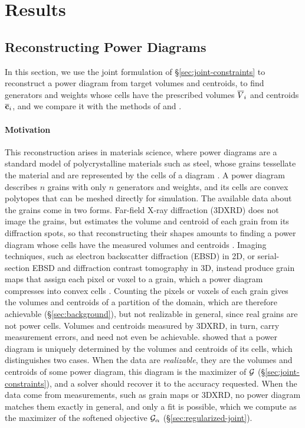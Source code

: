 \documentclass[main.tex]{subfiles}
\begin{document}
\section{Results}
\label{sec:results}

\subsection{Reconstructing Power Diagrams}
\label{sec:results-inverse}

In this section, we use the joint formulation of \S\ref{sec:joint-constraints} to reconstruct a power diagram from target volumes and centroids, \ie to find generators and weights whose cells have the prescribed volumes $\overline{V}_i$ and centroids $\overline{\mathbf{c}}_i$, and we compare it with the methods of \citet{Bourne2025Inverting} and \citet{Bourne2026ConvexOrder}.

\paragraph{Motivation}
This reconstruction arises in materials science, where power diagrams are a standard model of polycrystalline materials such as steel, whose grains tessellate the material and are represented by the cells of a diagram \cite{Lyckegaard2011Laguerre, Quey2018Optimal}.
A power diagram describes $n$ grains with only $n$ generators and weights, and its cells are convex polytopes that can be meshed directly for simulation.
The available data about the grains come in two forms.
Far-field X-ray diffraction (3DXRD) does not image the grains, but estimates the volume and centroid of each grain from its diffraction spots, so that reconstructing their shapes amounts to finding a power diagram whose cells have the measured volumes and centroids \cite{Petrich2019Reconstruction, Bourne2025Inverting}.
Imaging techniques, such as electron backscatter diffraction (EBSD) in 2D, or serial-section EBSD and diffraction contrast tomography in 3D, instead produce grain maps that assign each pixel or voxel to a grain, which a power diagram compresses into convex cells \cite{Spettl2016Fitting, Alpers2023GrainMaps, Bourne2025Inverting}.
Counting the pixels or voxels of each grain gives the volumes and centroids of a partition of the domain, which are therefore achievable (\S\ref{sec:background}), but not realizable in general, since real grains are not power cells.
Volumes and centroids measured by 3DXRD, in turn, carry measurement errors, and need not even be achievable.
\citet{Bourne2025Inverting} showed that a power diagram is uniquely determined by the volumes and centroids of its cells, which distinguishes two cases.
When the data are \emph{realizable}, \ie they are the volumes and centroids of some power diagram, this diagram is the maximizer of $\mathcal{G}$ (\S\ref{sec:joint-constraints}), and a solver should recover it to the accuracy requested.
When the data come from measurements, such as grain maps or 3DXRD, no power diagram matches them exactly in general, and only a fit is possible, which we compute as the maximizer of the softened objective $\mathcal{G}_\alpha$ (\S\ref{sec:regularized-joint}).
\end{document}
